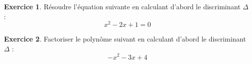 \documentclass{exam}
\theoremstyle{definition}
\newtheorem{exercice}{Exercice}
\begin{document}
\begin{exercice}
    Résoudre l'équation suivante en calculant d'abord le discriminant $\Delta$ :
    \[
    x^2 - 2x + 1 = 0
    \]
    \begin{center}
    \end{center}
\end{exercice}

\begin{exercice}
    Factoriser le polynôme suivant en calculant d'abord le discriminant $\Delta$ :
    \[
    -x^2 - 3x + 4
    \]
    \begin{center}
    \end{center}
\end{exercice}
\end{document}
